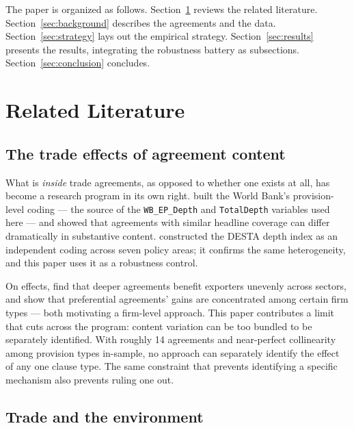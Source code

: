 \documentclass[12pt]{article}
\begin{document}
The paper is organized as follows. Section~\ref{sec:lit} reviews the related literature.
Section~\ref{sec:background} describes the agreements and the data.
Section~\ref{sec:strategy} lays out the empirical strategy. Section~\ref{sec:results}
presents the results, integrating the robustness battery as subsections.
Section~\ref{sec:conclusion} concludes.

\section{Related Literature}\label{sec:lit}

\subsection*{The trade effects of agreement content}

What is \emph{inside} trade agreements, as opposed to whether one exists at all, has become a research program in its own right. \citet{hofmann2017} built the World Bank's provision-level coding --- the source of the \texttt{WB\_EP\_Depth} and \texttt{TotalDepth} variables used here --- and showed that agreements with similar headline coverage can differ dramatically in substantive content. \citet{dur2014} constructed the DESTA depth index as an independent coding across seven policy areas; it confirms the same heterogeneity, and this paper uses it as a robustness control.

On effects, \citet{neri2023} find that deeper agreements benefit exporters unevenly across sectors, and \citet{baccini2017} show that preferential agreements' gains are concentrated among certain firm types --- both motivating a firm-level approach. This paper contributes a limit that cuts across the program: content variation can be too bundled to be separately identified. With roughly 14 agreements and near-perfect collinearity among provision types in-sample, no approach can separately identify the effect of any one clause type. The same constraint that prevents identifying a specific mechanism also prevents ruling one out.

\subsection*{Trade and the environment}
\end{document}
